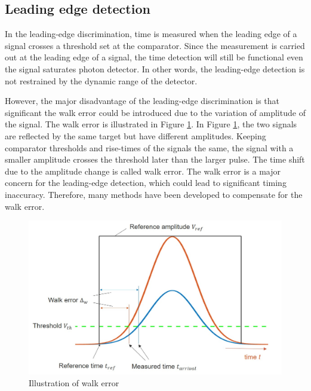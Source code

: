 \subsection{Leading edge detection}
In the leading-edge discrimination, time is measured when the leading edge of a signal crosses a threshold set at the comparator. Since the measurement is carried out at the leading edge of a signal, the time detection will still be functional even the signal saturates photon detector. In other words, the leading-edge detection is not restrained by the dynamic range of the detector. \par
However, the major disadvantage of the leading-edge discrimination is that significant the walk error could be introduced due to the variation of amplitude of the signal. The walk error is illustrated in Figure \ref{fig:TDC_walkerror}. In Figure \ref{fig:TDC_walkerror}, the two signals are reflected by the same target but have different amplitudes. Keeping comparator thresholds and rise-times of the signals the same, the signal with a smaller amplitude crosses the threshold later than the larger pulse. The time shift due to the amplitude change is called walk error. The walk error is a major concern for the leading-edge detection, which could lead to significant timing inaccuracy. Therefore, many methods have been developed to compensate for the walk error.
\begin{figure}[t!p]
\centering
\includegraphics[width=.8\textwidth]{figures/chapter3_TDC/walk_error.jpg}
\caption{Illustration of walk error}
\label{fig:TDC_walkerror}
\end{figure}
